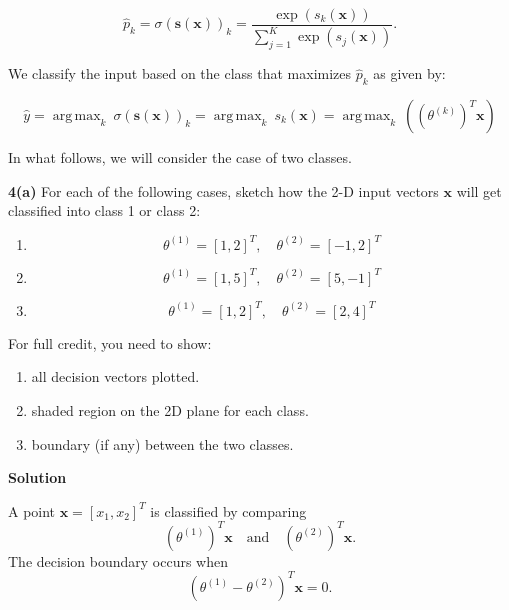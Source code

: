 \documentclass[12pt]{article}
\DeclareMathOperator*{\argmax}{arg\,max}
\begin{document}
	\[
	\hat{p}_k
	=
	\sigma(\mathbf{s}(\mathbf{x}))_k
	=
	\frac{\exp(s_k(\mathbf{x}))}
	{\sum_{j=1}^{K}\exp(s_j(\mathbf{x}))}.
	\]
	
	We classify the input based on the class that maximizes \(\hat{p}_k\) as given by:
	
	\[
	\hat{y}
	=
	\argmax_k\ \sigma(\mathbf{s}(\mathbf{x}))_k
	=
	\argmax_k\ s_k(\mathbf{x})
	=
	\argmax_k\ \left((\theta^{(k)})^T\mathbf{x}\right)
	\]
	
	In what follows, we will consider the case of two classes.
	
	\newpage
	
	\noindent\textbf{4(a)} For each of the following cases, sketch how the 2-D input vectors \(\mathbf{x}\) will get classified into class 1 or class 2:
	
	\begin{enumerate}[itemsep=6pt]
		
		\item[(i)]
		\[
		\theta^{(1)}=[1,2]^T,
		\quad
		\theta^{(2)}=[-1,2]^T
		\]
		
		\item[(ii)]
		\[
		\theta^{(1)}=[1,5]^T,
		\quad
		\theta^{(2)}=[5,-1]^T
		\]
		
		\item[(iii)]
		\[
		\theta^{(1)}=[1,2]^T,
		\quad
		\theta^{(2)}=[2,4]^T
		\]
		
	\end{enumerate}
	
	For full credit, you need to show:
	
	\begin{enumerate}[itemsep=6pt]
		
		\item[(a)] all decision vectors plotted.
		
		\item[(b)] shaded region on the 2D plane for each class.
		
		\item[(c)] boundary (if any) between the two classes.
		
	\end{enumerate}
	
	\noindent\textbf{Solution}
	
	A point \(\mathbf{x}=[x_1,x_2]^T\) is classified by comparing
	\[
	(\theta^{(1)})^T\mathbf{x}
	\quad \text{and} \quad
	(\theta^{(2)})^T\mathbf{x}.
	\]
	The decision boundary occurs when
	\[
	(\theta^{(1)}-\theta^{(2)})^T\mathbf{x}=0.
	\]
	
\end{document}
